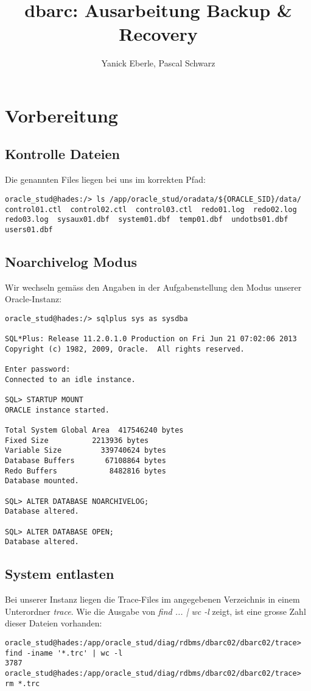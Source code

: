\documentclass[11pt,a4paper,parskip=half]{scrartcl}
\title{dbarc: Ausarbeitung Backup \& Recovery}
\author{Yanick Eberle, Pascal Schwarz}
\begin{document}
\maketitle
\vfill
\tableofcontents

\pagestyle{fancy}
\section{Vorbereitung}
\subsection{Kontrolle Dateien}
Die genannten Files liegen bei uns im korrekten Pfad:
\begin{lstlisting}
oracle_stud@hades:/> ls /app/oracle_stud/oradata/${ORACLE_SID}/data/
control01.ctl  control02.ctl  control03.ctl  redo01.log  redo02.log  redo03.log  sysaux01.dbf  system01.dbf  temp01.dbf  undotbs01.dbf  users01.dbf
\end{lstlisting}

\subsection{Noarchivelog Modus}
Wir wechseln gemäss den Angaben in der Aufgabenstellung den Modus unserer Oracle-Instanz:
\begin{lstlisting}
oracle_stud@hades:/> sqlplus sys as sysdba

SQL*Plus: Release 11.2.0.1.0 Production on Fri Jun 21 07:02:06 2013
Copyright (c) 1982, 2009, Oracle.  All rights reserved.

Enter password: 
Connected to an idle instance.

SQL> STARTUP MOUNT
ORACLE instance started.

Total System Global Area  417546240 bytes
Fixed Size		    2213936 bytes
Variable Size		  339740624 bytes
Database Buffers	   67108864 bytes
Redo Buffers		    8482816 bytes
Database mounted.

SQL> ALTER DATABASE NOARCHIVELOG;
Database altered.

SQL> ALTER DATABASE OPEN;
Database altered.
\end{lstlisting}

\subsection{System entlasten}
Bei unserer Instanz liegen die Trace-Files im angegebenen Verzeichnis in einem Unterordner \emph{trace}. Wie die Ausgabe von \emph{find ... | wc -l} zeigt, ist eine grosse Zahl dieser Dateien vorhanden:
\begin{lstlisting}
oracle_stud@hades:/app/oracle_stud/diag/rdbms/dbarc02/dbarc02/trace> find -iname '*.trc' | wc -l
3787
oracle_stud@hades:/app/oracle_stud/diag/rdbms/dbarc02/dbarc02/trace> rm *.trc

\end{lstlisting}
\end{document}
